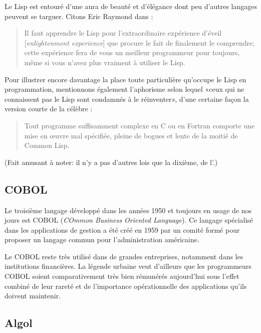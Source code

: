 Le Lisp est entouré d'une aura de beauté et d'élégance dont peu
d'autres langages peuvent se targuer. Citons Eric Raymond dans
:
\begin{quote}
  Il faut apprendre le Lisp pour l'extraordinaire expérience d'éveil
  [\emph{enlightenment experience}] que procure le fait de finalement
  le comprendre; cette expérience fera de vous un meilleur programmeur
  pour toujours, même si vous n'avez plus vraiment à utiliser le Lisp.
\end{quote}

Pour illustrer encore davantage la place toute particulière qu'occupe
le Lisp en programmation, mentionnons également l'aphorisme selon
lequel «ceux qui ne connaissent pas le Lisp sont condamnés à le
réinventer», d'une certaine façon la version courte de la célèbre
: %
\begin{quote}
  Tout programme suffisamment complexe en C ou en Fortran comporte une
  mise en œuvre mal spécifiée, pleine de bogues et lente de la moitié
  de Common Lisp.
\end{quote}
(Fait amusant à noter: il n'y a pas d'autres lois que la dixième, de
l'.)

\subsection{COBOL}
\label{sec:informatique:historique:cobol}

Le troisième langage développé dans les années 1950 et toujours en
usage de nos jours est COBOL (\emph{COmmon Business
  Oriented Language}). Ce langage spécialisé dans les applications de
gestion a été créé en 1959 par un comité formé pour proposer un
langage commun pour l'administration américaine.

Le COBOL reste très utilisé dans de grandes entreprises, notamment
dans les institutions financières. La légende urbaine veut d'ailleurs
que les programmeurs COBOL soient comparativement très bien rémunérés
aujourd'hui sous l'effet combiné de leur rareté et de l'importance
opérationnelle des applications qu'ils doivent maintenir.

\subsection{Algol}
\label{sec:informatique:historique:algol}

